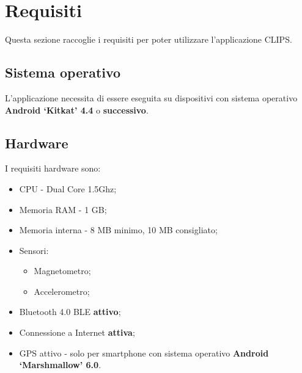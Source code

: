\documentclass[../ClipsManualeUtente.tex]{subfiles}
\begin{document}
\section{Requisiti}
	Questa sezione raccoglie i requisiti per poter utilizzare l'applicazione CLIPS.
	
	\subsection{Sistema operativo}
		L'applicazione necessita di essere eseguita su dispositivi con sistema operativo \textbf{Android `Kitkat' 4.4} o \textbf{successivo}.
	
	\subsection{Hardware}
		I requisiti hardware sono:
		\begin{itemize}
			\item CPU - Dual Core 1.5Ghz;
			\item Memoria RAM - 1 GB;
			\item Memoria interna - 8 MB minimo, 10 MB consigliato;
			\item Sensori:
			\begin{itemize}
				\item Magnetometro;
				\item Accelerometro;
			\end{itemize}
			\item \gls{Bluetooth} 4.0 \gls{BLE} \textbf{attivo};
			\item Connessione a Internet \textbf{attiva};
			\item GPS attivo - solo per smartphone con sistema operativo \textbf{Android `Marshmallow' 6.0}.
		\end{itemize}
		
	
		
\end{document}
